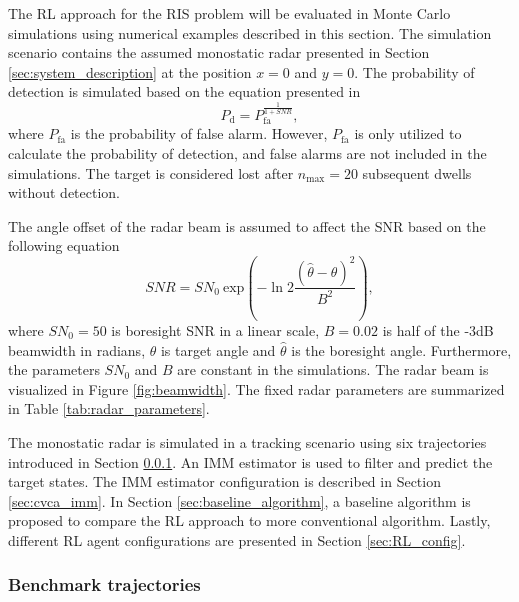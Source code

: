 \documentclass[english, 12pt, a4paper, elec, utf8, a-1b, online]{aaltothesis}
\newcommand{\sno}{SN_0}
\renewcommand{\exp}[1]{\text{exp}\left( #1 \right)}
\newcommand{\nmax}{n_\text{max}}
\begin{document}
The RL approach for the RIS problem will be evaluated in Monte Carlo simulations using numerical examples described in this section.
The simulation scenario contains the assumed monostatic radar presented in Section \ref{sec:system_description} at the position $x=0$ and $y=0$. 
The probability of detection is simulated based on the equation presented in \cite{vanKeuk1993}
\begin{equation}\label{eq:singer_1_pd}
    P_\text{d} = P_\text{fa}^{\frac{1}{1+SNR}},
\end{equation}
where $P_\text{fa}$ is the probability of false alarm.
However, $P_\text{fa}$ is only utilized to calculate the probability of detection, and false alarms are not included in the simulations.
The target is considered lost after $\nmax=20$ subsequent dwells without detection.

The angle offset of the radar beam is assumed to affect the SNR based on the following equation
\begin{equation} \label{eq:offset_snr}
    SNR = \sno~\exp{ - \ln{2}
        \frac
            {(\hat{\theta} - \theta)^2}
            {B^2}},
\end{equation}
where $\sno=50$ is boresight SNR in a linear scale, $B=0.02$ is half of the -3dB beamwidth in radians, $\theta$ is target angle and $\hat{\theta} $ is the boresight angle. 
Furthermore, the parameters $\sno$ and $B$ are constant in the simulations. 
The radar beam is visualized in Figure \ref{fig:beamwidth}.
The fixed radar parameters are summarized in Table \ref{tab:radar_parameters}.

The monostatic radar is simulated in a tracking scenario using six trajectories introduced in Section \ref{sec:benchmark_trajectories}.
An IMM estimator is used to filter and predict the target states. 
The IMM estimator configuration is described in Section \ref{sec:cvca_imm}.
In Section \ref{sec:baseline_algorithm}, a baseline algorithm is proposed to compare the RL approach to more conventional algorithm.
Lastly, different RL agent configurations are presented in Section \ref{sec:RL_config}.


\subsubsection{Benchmark trajectories} \label{sec:benchmark_trajectories}
\end{document}
